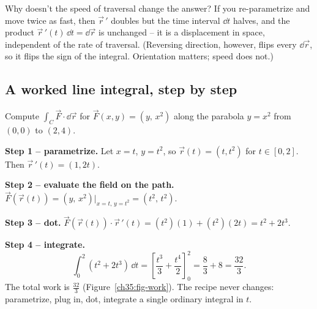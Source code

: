 \begin{walkbox}
Why doesn't the speed of traversal change the answer? If you re-parametrize and
move twice as fast, then $\vec r\,'$ doubles but the time interval $\dd t$ halves,
and the product $\vec r\,'(t)\,\dd t = \dd\vec r$ is unchanged -- it is a
displacement in space, independent of the rate of traversal. (Reversing direction, however, flips every
$\dd\vec r$, so it flips the sign of the integral. Orientation matters; speed does
not.)
\end{walkbox}

\subsection{A worked line integral, step by step}

\begin{example}
\label{ch35:ex-parab}
Compute $\displaystyle\int_C \vec F\cdot\dd\vec r$ for $\vec F(x,y)=(y,\,x^2)$
along the parabola $y=x^2$ from $(0,0)$ to $(2,4)$.

\textbf{Step 1 -- parametrize.} Let $x=t$, $y=t^2$, so $\vec r(t)=(t,t^2)$ for
$t\in[0,2]$. Then $\vec r\,'(t)=(1,2t)$.

\textbf{Step 2 -- evaluate the field on the path.}
$\vec F(\vec r(t)) = (y,\,x^2)\big|_{x=t,\,y=t^2} = (t^2,\, t^2)$.

\textbf{Step 3 -- dot.}
$\vec F(\vec r(t))\cdot\vec r\,'(t) = (t^2)(1)+(t^2)(2t) = t^2 + 2t^3$.

\textbf{Step 4 -- integrate.}
\[
  \int_0^2 (t^2 + 2t^3)\,\dd t
  = \left[\frac{t^3}{3} + \frac{t^4}{2}\right]_0^2
  = \frac{8}{3} + 8 = \frac{32}{3}.
\]
The total work is $\tfrac{32}{3}$ (Figure~\ref{ch35:fig-work}). The recipe never
changes: parametrize, plug in, dot, integrate a single ordinary integral in $t$.
\end{example}

